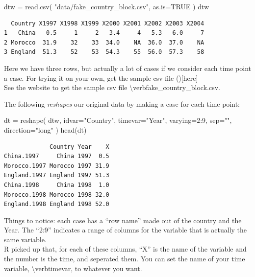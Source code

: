 \documentclass[
  letterpaper,
  DIV=11,
  numbers=noendperiod]{scrreprt}
\newenvironment{Shaded}{}{}
\newcommand{\AttributeTok}[1]{\textcolor[rgb]{0.49,0.56,0.16}{#1}}
\newcommand{\ConstantTok}[1]{\textcolor[rgb]{0.53,0.00,0.00}{#1}}
\newcommand{\DecValTok}[1]{\textcolor[rgb]{0.25,0.63,0.44}{#1}}
\newcommand{\FunctionTok}[1]{\textcolor[rgb]{0.02,0.16,0.49}{#1}}
\newcommand{\NormalTok}[1]{#1}
\newcommand{\OtherTok}[1]{\textcolor[rgb]{0.00,0.44,0.13}{#1}}
\newcommand{\SpecialCharTok}[1]{\textcolor[rgb]{0.25,0.44,0.63}{#1}}
\newcommand{\StringTok}[1]{\textcolor[rgb]{0.25,0.44,0.63}{#1}}
\begin{document}
\begin{Shaded}
\begin{Highlighting}[]
\NormalTok{dtw }\OtherTok{=} \FunctionTok{read.csv}\NormalTok{( }\StringTok{"data/fake\_country\_block.csv"}\NormalTok{, }\AttributeTok{as.is=}\ConstantTok{TRUE}\NormalTok{ )}
\NormalTok{dtw}
\end{Highlighting}
\end{Shaded}

\begin{verbatim}
  Country X1997 X1998 X1999 X2000 X2001 X2002 X2003 X2004
1   China   0.5     1     2   3.4     4   5.3   6.0     7
2 Morocco  31.9    32    33  34.0    NA  36.0  37.0    NA
3 England  51.3    52    53  54.3    55  56.0  57.3    58
\end{verbatim}

Here we have three rows, but actually a lot of cases if we consider each
time point a case. For trying it on your own, get the sample csv file
(){[}here{]}\\
See the website to get the sample csv file
\textbackslash verb\textbar fake\_country\_block.csv\textbar.

The following \emph{reshapes} our original data by making a case for
each time point:

\begin{Shaded}
\begin{Highlighting}[]
\NormalTok{dt }\OtherTok{=} \FunctionTok{reshape}\NormalTok{( dtw, }\AttributeTok{idvar=}\StringTok{"Country"}\NormalTok{, }\AttributeTok{timevar=}\StringTok{"Year"}\NormalTok{, }\AttributeTok{varying=}\DecValTok{2}\SpecialCharTok{:}\DecValTok{9}\NormalTok{, }\AttributeTok{sep=}\StringTok{""}\NormalTok{, }\AttributeTok{direction=}\StringTok{"long"}\NormalTok{ )}
\FunctionTok{head}\NormalTok{(dt)}
\end{Highlighting}
\end{Shaded}

\begin{verbatim}
             Country Year    X
China.1997     China 1997  0.5
Morocco.1997 Morocco 1997 31.9
England.1997 England 1997 51.3
China.1998     China 1998  1.0
Morocco.1998 Morocco 1998 32.0
England.1998 England 1998 52.0
\end{verbatim}

Things to notice: each case has a ``row name'' made out of the country
and the Year. The ``2:9'' indicates a range of columns for the variable
that is actually the same variable.\\
R picked up that, for each of these columns, ``X'' is the name of the
variable and the number is the time, and seperated them. You can set the
name of your time variable, \textbackslash verb\textbar timevar\textbar,
to whatever you want.
\end{document}
